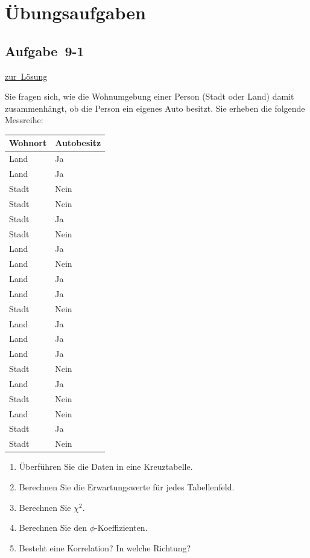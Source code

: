 \documentclass[
  11pt,
  ngerman,
  a4paper,
]{report}
\begin{document}
\hypertarget{uxfcbungsaufgaben-8}{%
\section*{Übungsaufgaben}\label{uxfcbungsaufgaben-8}}

\hypertarget{aufgabe-9-1}{%
\subsection{Aufgabe~9-1}\label{aufgabe-9-1}}

\protect\hyperlink{loesung-9-1}{zur~Lösung}

Sie fragen sich, wie die Wohnumgebung einer Person (Stadt oder Land) damit zusammenhängt, ob die Person ein eigenes Auto besitzt. Sie erheben die folgende Messreihe:

\begin{table}[H]
\centering
\begin{tabular}{ll}
\toprule
\textbf{Wohnort} & \textbf{Autobesitz}\\
\midrule
Land & \vphantom{8} Ja\\
Land & \vphantom{7} Ja\\
Stadt & \vphantom{6} Nein\\
Stadt & \vphantom{5} Nein\\
Stadt & \vphantom{1} Ja\\
Stadt & \vphantom{4} Nein\\
Land & \vphantom{6} Ja\\
Land & \vphantom{1} Nein\\
Land & \vphantom{5} Ja\\
Land & \vphantom{4} Ja\\
Stadt & \vphantom{3} Nein\\
Land & \vphantom{3} Ja\\
Land & \vphantom{2} Ja\\
Land & \vphantom{1} Ja\\
Stadt & \vphantom{2} Nein\\
Land & Ja\\
Stadt & \vphantom{1} Nein\\
Land & Nein\\
Stadt & Ja\\
Stadt & Nein\\
\bottomrule
\end{tabular}
\end{table}

\begin{enumerate}
\def\labelenumi{\alph{enumi})}
\item
  Überführen Sie die Daten in eine Kreuztabelle.
\item
  Berechnen Sie die Erwartungswerte für jedes Tabellenfeld.
\item
  Berechnen Sie \(\chi^2\).
\item
  Berechnen Sie den \(\phi\)-Koeffizienten.
\item
  Besteht eine Korrelation? In welche Richtung?
\end{enumerate}
\end{document}
